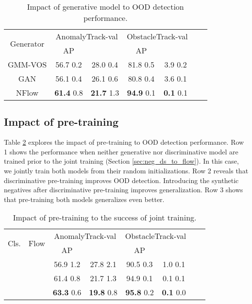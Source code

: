 \documentclass[lettersize,journal,hidelinks]{IEEEtran}
\newcommand{\cmark}{\ding{51}}
\newcommand{\xmark}{\ding{55}}
\begin{document}
\begin{table}[ht]
\centering
\caption{
Impact of generative model to OOD detection performance.
}
\label{tbl:abl-gm}
\begin{footnotesize}
\begin{tabular}{c|cccccc}
\hline \hline
 \multirow{2}{*}{Generator} & \multicolumn{2}{c|}{AnomalyTrack-val} & \multicolumn{2}{c}{ObstacleTrack-val}\\
   &  \multicolumn{1}{c}{AP} & \multicolumn{1}{c|}{} & AP & \multicolumn{1}{c}{}\\ \hline \hline
    GMM-VOS & 56.7  0.2 & 28.0  0.4 & 81.8  0.5 & 3.9  0.2 \\
 GAN  & 56.1  0.4 & 26.1  0.6 & 80.8  0.4 & 3.6  0.1 \\
  NFlow & \textbf{61.4}  0.8& \textbf{21.7}  1.3& \textbf{94.9}  0.1& \textbf{0.1}  0.1\\
\hline
\end{tabular}
\end{footnotesize}
\end{table}

\subsection{Impact of pre-training}

Table \ref{tbl:abl-train} explores the impact of pre-training to OOD detection performance.
Row 1 shows the performance when neither generative nor discriminative model are trained prior to the joint training (Section \ref{sec:neg_ds_to_flow}).
In this case, we jointly train both models from their random initializations.
Row 2 reveals that discriminative pre-training improves OOD detection.
Introducing the synthetic negatives after discriminative pre-training improves generalization.
Row 3 shows that pre-training both models generalizes even better.
\begin{table}[ht]
\centering
\caption{Impact of pre-training to the success of joint training.
}
\label{tbl:abl-train}
\begin{footnotesize}
\begin{tabular}{cc|cccccc}
\hline \hline
 \multirow{2}{*}{Cls.} & \multirow{2}{*}{Flow} & \multicolumn{2}{c|}{AnomalyTrack-val} & \multicolumn{2}{c}{ObstacleTrack-val}\\
   & &  \multicolumn{1}{c}{AP} & \multicolumn{1}{c|}{} & AP & \multicolumn{1}{c}{}\\ \hline \hline
 \xmark & \xmark & 56.9  1.2& 27.8  2.1& 90.5   0.3& 1.0  0.1\\
 \cmark & \xmark & 61.4  0.8& 21.7  1.3& 94.9  0.1& 0.1  0.1\\
 \cmark & \cmark & \textbf{63.3}  0.6& \textbf{19.8}  0.8& \textbf{95.8}  0.2& \textbf{0.1}  0.0\\
\hline
\end{tabular}
\end{footnotesize}
\end{table}
\end{document}
